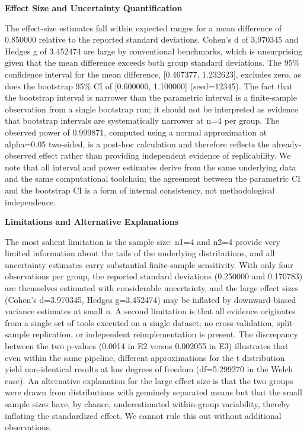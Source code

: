 \documentclass[11pt,a4paper]{article}
\begin{document}
\textbf{Effect Size and Uncertainty Quantification}

The effect-size estimates fall within expected ranges for a mean difference of 0.850000 relative to the reported standard deviations. Cohen's d of 3.970345 and Hedges g of 3.452474 are large by conventional benchmarks, which is unsurprising given that the mean difference exceeds both group standard deviations. The 95\% confidence interval for the mean difference, [0.467377, 1.232623], excludes zero, as does the bootstrap 95\% CI of [0.600000, 1.100000] (seed=12345). The fact that the bootstrap interval is narrower than the parametric interval is a finite-sample observation from a single bootstrap run; it should not be interpreted as evidence that bootstrap intervals are systematically narrower at n=4 per group. The observed power of 0.999871, computed using a normal approximation at alpha=0.05 two-sided, is a post-hoc calculation and therefore reflects the already-observed effect rather than providing independent evidence of replicability. We note that all interval and power estimates derive from the same underlying data and the same computational toolchain; the agreement between the parametric CI and the bootstrap CI is a form of internal consistency, not methodological independence.

\textbf{Limitations and Alternative Explanations}

The most salient limitation is the sample size: n1=4 and n2=4 provide very limited information about the tails of the underlying distributions, and all uncertainty estimates carry substantial finite-sample sensitivity. With only four observations per group, the reported standard deviations (0.250000 and 0.170783) are themselves estimated with considerable uncertainty, and the large effect sizes (Cohen's d=3.970345, Hedges g=3.452474) may be inflated by downward-biased variance estimates at small n. A second limitation is that all evidence originates from a single set of tools executed on a single dataset; no cross-validation, split-sample replication, or independent reimplementation is present. The discrepancy between the two p-values (0.0014 in E2 versus 0.002055 in E3) illustrates that even within the same pipeline, different approximations for the t distribution yield non-identical results at low degrees of freedom (df=5.299270 in the Welch case). An alternative explanation for the large effect size is that the two groups were drawn from distributions with genuinely separated means but that the small sample sizes have, by chance, underestimated within-group variability, thereby inflating the standardized effect. We cannot rule this out without additional observations.
\end{document}
